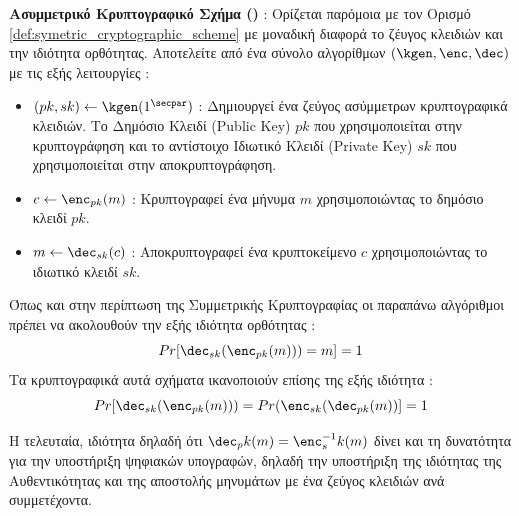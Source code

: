\begin{definition}
\label{def:assymetric_cryptographic_scheme}
\textbf{Ασυμμετρικό Κρυπτογραφικό Σχήμα ()} : Ορίζεται παρόμοια με τον Ορισμό \ref{def:symetric_cryptographic_scheme} με μοναδική διαφορά το ζέυγος κλειδιών και την ιδιότητα ορθότητας. Αποτελείτε από ένα σύνολο αλγορίθμων $(\kgen, \enc, \dec)$ με τις εξής λειτουργίες :
\begin{itemize}
    \item $(pk, sk) \leftarrow \kgen(1^\secpar)$ : Δημιουργεί ένα ζεύγος ασύμμετρων κρυπτογραφικά κλειδιών. Το Δημόσιο Κλειδί (Public Key) $pk$ που χρησιμοποιείται στην κρυπτογράφηση και το αντίστοιχο Ιδιωτικό Κλειδί (Private Key) $sk$ που χρησιμοποιείται στην αποκρυπτογράφηση.
    \item $c \leftarrow \enc_{pk}(m)$ : Κρυπτογραφεί ένα μήνυμα $m$ χρησιμοποιώντας το δημόσιο κλειδί $pk$.
    \item $m \leftarrow \dec_{sk}(c)$ : Αποκρυπτογραφεί ένα κρυπτοκείμενο $c$ χρησιμοποιώντας το ιδιωτικό κλειδί $sk$.
\end{itemize}
Όπως και στην περίπτωση της Συμμετρικής Κρυπτογραφίας οι παραπάνω αλγόριθμοι πρέπει να ακολουθούν την εξής ιδιότητα ορθότητας :
\[
    Pr[\dec_{sk}(\enc_{pk}(m))) = m] = 1
\]
Τα κρυπτογραφικά αυτά σχήματα ικανοποιούν επίσης της εξής ιδιότητα :
\[
Pr[\dec_{sk}(\enc_{pk}(m))) = Pr(\enc_{sk}(\dec_{pk}(m))
] = 1
\]
\end{definition}

Η τελευταία, ιδιότητα δηλαδή ότι $\dec_pk(m)=\enc^{-1}_sk(m)$ δίνει και τη δυνατότητα για την υποστήριξη ψηφιακών υπογραφών, δηλαδή την υποστήριξη της ιδιότητας της Αυθεντικότητας και της αποστολής μηνυμάτων με ένα ζεύγος κλειδιών ανά συμμετέχοντα.

